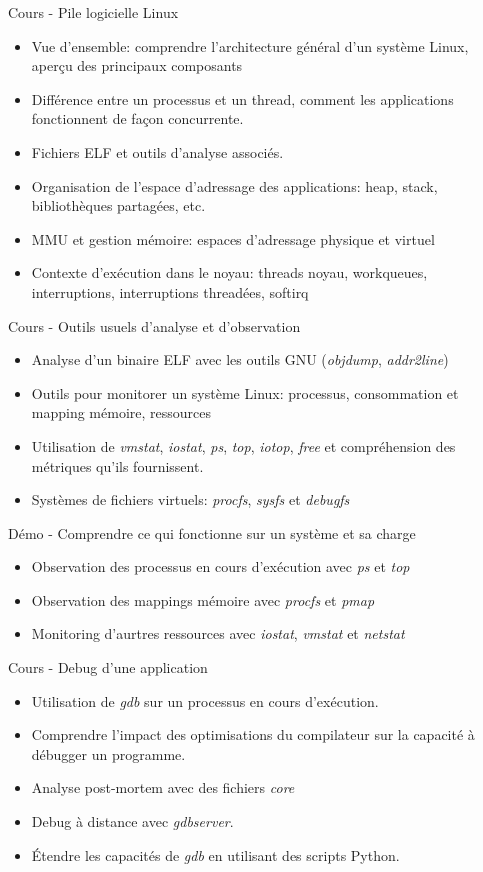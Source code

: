 \documentclass[a4paper,12pt,obeyspaces,spaces,hyphens]{article}
\begin{document}
\feagendaonecolumn
{Cours - Pile logicielle Linux}
{
  \begin{itemize}
  \item Vue d'ensemble: comprendre l'architecture général d'un système
    Linux, aperçu des principaux composants
  \item Différence entre un processus et un thread, comment les
    applications fonctionnent de façon concurrente.
  \item Fichiers ELF et outils d'analyse associés.
  \item Organisation de l'espace d'adressage des applications: heap,
    stack, bibliothèques partagées, etc.
  \item MMU et gestion mémoire: espaces d'adressage physique et
    virtuel
  \item Contexte d'exécution dans le noyau: threads noyau, workqueues,
    interruptions, interruptions threadées, softirq
  \end{itemize}
}

\feagendatwocolumn
{Cours - Outils usuels d'analyse et d'observation}
{
  \begin{itemize}
  \item Analyse d'un binaire ELF avec les outils GNU ({\em objdump},
    {\em addr2line})
  \item Outils pour monitorer un système Linux: processus,
    consommation et mapping mémoire, ressources
  \item Utilisation de {\em vmstat}, {\em iostat}, {\em ps}, {\em
      top}, {\em iotop}, {\em free} et compréhension des métriques
    qu'ils fournissent.
  \item Systèmes de fichiers virtuels: {\em procfs}, {\em sysfs} et
    {\em debugfs}
  \end{itemize}
}
{Démo - Comprendre ce qui fonctionne sur un système et sa charge}
{
  \begin{itemize}
  \item Observation des processus en cours d'exécution avec {\em ps} et {\em top}
  \item Observation des mappings mémoire avec {\em procfs} et {\em pmap}
  \item Monitoring d'aurtres ressources avec {\em iostat}, {\em
      vmstat} et {\em netstat}
 \end{itemize}
}

\feagendaonecolumn
{Cours - Debug d'une application}
{
  \begin{itemize}
  \item Utilisation de {\em gdb} sur un processus en cours d'exécution.
  \item Comprendre l'impact des optimisations du compilateur sur la
    capacité à débugger un programme.
  \item Analyse post-mortem avec des fichiers {\em core}
  \item Debug à distance avec {\em gdbserver}.
  \item Étendre les capacités de {\em gdb} en utilisant des scripts
    Python.
  \end{itemize}
}
\end{document}
